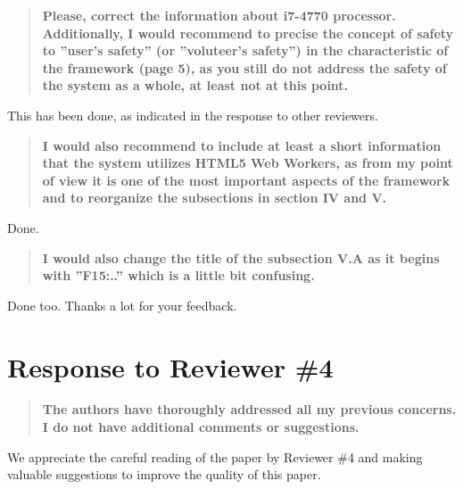 \documentclass[preprint]{elsarticle}
\begin{document}
\begin{quote}
\textbf{Please, correct the information about i7-4770
  processor. Additionally, I would recommend to precise the concept of
  safety to ''user's safety'' (or ''voluteer's safety'') in the
  characteristic of the framework (page 5), as you still do not
  address the safety of the system as a whole, at least not at this
  point.}
\end{quote}

This has been done, as indicated in the response to other reviewers. 

\begin{quote}
\textbf{I would also recommend to include at least a short information
  that the system utilizes HTML5 Web Workers, as from my point of view
  it is one of the most important aspects of the framework and to
  reorganize the subsections in section IV and V.}
\end{quote}

Done.

\begin{quote}
\textbf{I would also change the title of the subsection V.A as it begins with ''F15:..'' which is a little bit confusing.}
\end{quote}

Done too. Thanks a lot for your feedback. 



\section{Response to Reviewer \#4}

\begin{quote}\textbf{The authors have thoroughly addressed all my previous concerns. I do not have additional comments or suggestions.
}\end{quote}

We appreciate the careful reading of the paper by Reviewer \#4 and making valuable suggestions to improve the quality of this paper.




\end{document}
